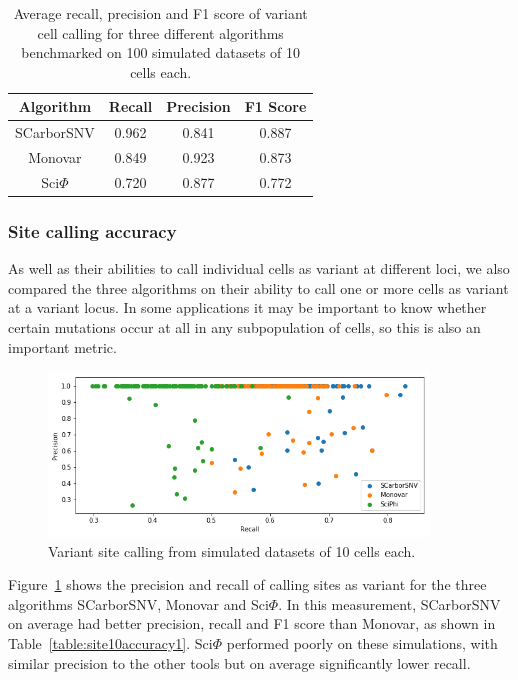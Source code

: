 \documentclass[../../main.tex]{subfiles}
\begin{document}
\begin{table}[h]
    \centering
    \begin{tabular}{||c|c c c||}
        \hline\hline
        Algorithm & Recall & Precision & F1 Score\\
        \hline
        SCarborSNV & 0.962 & 0.841 & 0.887\\
        Monovar & 0.849 & 0.923 & 0.873\\
        Sci$\Phi$ & 0.720 & 0.877 & 0.772 \\
        \hline\hline
    \end{tabular}
    \caption{Average recall, precision and F1 score of variant cell calling for three different algorithms benchmarked on 100 simulated datasets of 10 cells each.}
    \label{table:cell10accuracy1}
\end{table}


\subsubsection*{Site calling accuracy}
As well as their abilities to call individual cells as variant at different loci, we also compared the three algorithms on their ability to call one or more cells as variant at a variant locus.
In some applications it may be important to know whether certain mutations occur at all in any subpopulation of cells, so this is also an important metric.

\begin{figure}[h] 
    \includegraphics[width=0.9\textwidth]{sections/graphics/site10accuracy1}
    \caption{Variant site calling from simulated datasets of 10 cells each.}
    \label{fig:site10accuracy1}
\end{figure}

Figure~\ref{fig:site10accuracy1} shows the precision and recall of calling sites as variant for the three algorithms SCarborSNV, Monovar and Sci$\Phi$.
In this measurement, SCarborSNV on average had better precision, recall and F1 score than Monovar, as shown in Table~\ref{table:site10accuracy1}.
Sci$\Phi$ performed poorly on these simulations, with similar precision to the other tools but on average significantly lower recall.
\end{document}
